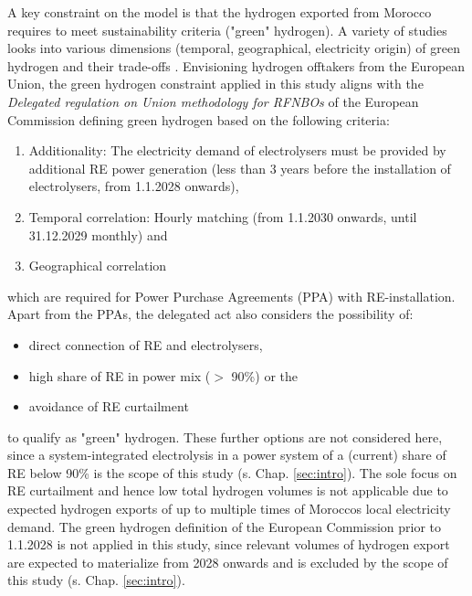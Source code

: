 A key constraint on the model is that the hydrogen exported from Morocco requires to meet sustainability criteria ("green" hydrogen). A variety of studies looks into various dimensions (temporal, geographical, electricity origin) of green hydrogen and their trade-offs \cite{Brauer2022, Ruhnau2022}. %
Envisioning hydrogen offtakers from the European Union, the green hydrogen constraint applied in this study aligns with the \emph{Delegated regulation on Union methodology for RFNBOs} of the European Commission \cite{Commission2023} defining green hydrogen  based on the following criteria:

\begin{enumerate}
    \item Additionality: The electricity demand of electrolysers must be provided by additional RE power generation (less than 3 years before the installation of electrolysers, from 1.1.2028 onwards),
    \item Temporal correlation: Hourly matching (from 1.1.2030 onwards, until 31.12.2029 monthly) and
    \item Geographical correlation
\end{enumerate}
which are required for Power Purchase Agreements (PPA) with RE-installation. Apart from the PPAs, the delegated act also considers the possibility of:
\begin{itemize}
    \item direct connection of RE and electrolysers,
    \item high share of RE in power mix ($>$ 90\%) or the
    \item avoidance of RE curtailment
\end{itemize}
to qualify as "green" hydrogen. These further options are not considered here, since a system-integrated electrolysis in a power system of a (current) share of RE below 90\% is the scope of this study (s. Chap. \ref{sec:intro}). The sole focus on RE curtailment and hence low total hydrogen volumes is not applicable due to expected hydrogen exports of up to multiple times of Moroccos local electricity demand. The green hydrogen definition of the European Commission prior to 1.1.2028 is not applied in this study, since relevant volumes of hydrogen export are expected to materialize from 2028 onwards and is excluded by the scope of this study (s. Chap. \ref{sec:intro}).


